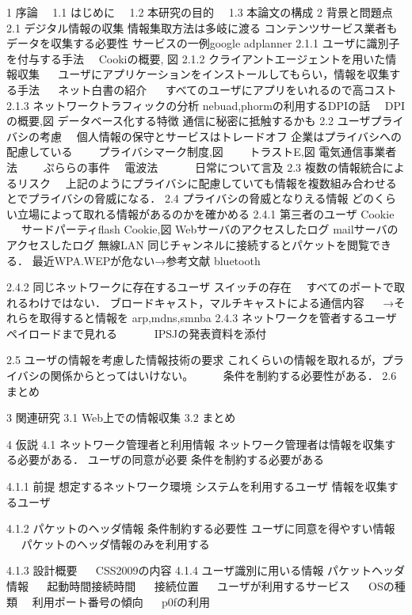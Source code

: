 1 序論
　1.1 はじめに
　1.2 本研究の目的
　1.3 本論文の構成
2 背景と問題点
 2.1 デジタル情報の収集
   情報集取方法は多岐に渡る
   コンテンツサービス業者もデータを収集する必要性
   サービスの一例google adplanner
  2.1.1 ユーザに識別子を付与する手法
 　Cookiの概要, 図
  2.1.2 クライアントエージェントを用いた情報収集
　 ユーザにアプリケーションをインストールしてもらい，情報を収集する手法
　 ネット白書の紹介
　 すべてのユーザにアプリをいれるので高コスト
  2.1.3 ネットワークトラフィックの分析
   nebuad,phormの利用するDPIの話
 　DPIの概要,図
    データベース化する特徴
    通信に秘密に抵触するかも
 2.2 ユーザプライバシの考慮
 　個人情報の保守とサービスはトレードオフ
   企業はプライバシへの配慮している
  　　プライバシマーク制度,図
  　　トラストE,図
  電気通信事業者法
  　　ぷららの事件
　電波法
　　　日常について言及
 2.3 複数の情報統合によるリスク
   　上記のようにプライバシに配慮していても情報を複数組み合わせるとでプライバシの脅威になる．
 2.4 プライバシの脅威となりえる情報
     どのくらい立場によって取れる情報があるのかを確かめる
  2.4.1 第三者のユーザ
    Cookie
　   サードパーティflash Cookie,図
    Webサーバのアクセスしたログ
    mailサーバのアクセスしたログ
    無線LAN
     同じチャンネルに接続するとパケットを閲覧できる．
     最近WPA.WEPが危ない→参考文献
    bluetooth

  2.4.2 同じネットワークに存在するユーザ
    スイッチの存在
    　すべてのポートで取れるわけではない．
    ブロードキャスト，マルチキャストによる通信内容
　   →それらを取得すると情報を
     arp,mdns,smnba
    2.4.3 ネットワークを管者するユーザ
    ペイロードまで見れる
　　　IPSJの発表資料を添付
   
   2.5 ユーザの情報を考慮した情報技術の要求
   これくらいの情報を取れるが，プライバシの関係からとってはいけない。
　　 条件を制約する必要性がある．
   2.6 まとめ

3 関連研究
 3.1 Web上での情報収集
 3.2 まとめ

4 仮説
 4.1 ネットワーク管理者と利用情報
 ネットワーク管理者は情報を収集する必要がある．
 ユーザの同意が必要
 条件を制約する必要がある

  4.1.1 前提
  想定するネットワーク環境
  システムを利用するユーザ
  情報を収集するユーザ
  
  4.1.2 パケットのヘッダ情報
  条件制約する必要性
  ユーザに同意を得やすい情報
　  パケットのヘッダ情報のみを利用する
 
  4.1.3 設計概要
　  CSS2009の内容
  4.1.4 ユーザ識別に用いる情報
   パケットヘッダ情報
　 起動時間接続時間
　 接続位置
　 ユーザが利用するサービス
　 OSの種類
  　利用ポート番号の傾向
　  p0fの利用

